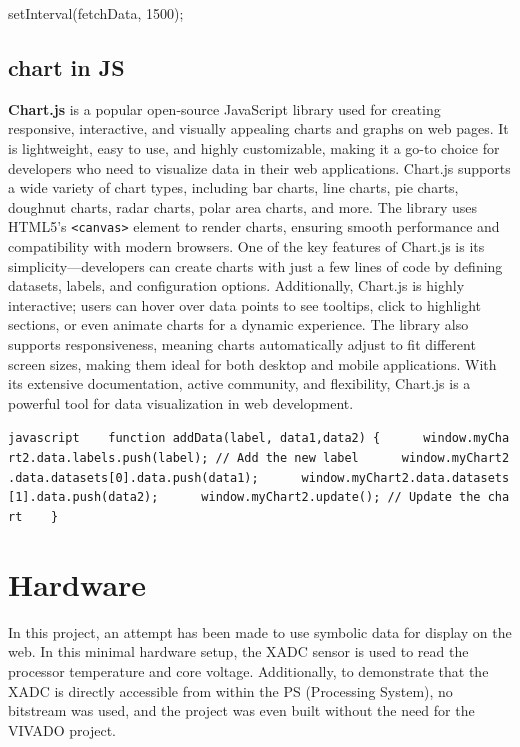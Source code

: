 \documentclass[11pt]{article}
\newenvironment{Shaded}{}{}
\newcommand{\DecValTok}[1]{\textcolor[rgb]{0.25,0.63,0.44}{{#1}}}
\newcommand{\NormalTok}[1]{{#1}}
\newcommand{\OperatorTok}[1]{\textcolor[rgb]{0.40,0.40,0.40}{{#1}}}
\newcommand{\AttributeTok}[1]{\textcolor[rgb]{0.49,0.56,0.16}{{#1}}}
\begin{document}
\begin{Shaded}
\begin{Highlighting}[]
\AttributeTok{setInterval}\NormalTok{(fetchData}\OperatorTok{,} \DecValTok{1500}\NormalTok{)}\OperatorTok{;}
\end{Highlighting}
\end{Shaded}

    \subsection{chart in JS}\label{chart-in-js}

\textbf{Chart.js} is a popular open-source JavaScript library used for
creating responsive, interactive, and visually appealing charts and
graphs on web pages. It is lightweight, easy to use, and highly
customizable, making it a go-to choice for developers who need to
visualize data in their web applications. Chart.js supports a wide
variety of chart types, including bar charts, line charts, pie charts,
doughnut charts, radar charts, polar area charts, and more. The library
uses HTML5's \texttt{\textless{}canvas\textgreater{}} element to render
charts, ensuring smooth performance and compatibility with modern
browsers. One of the key features of Chart.js is its
simplicity---developers can create charts with just a few lines of code
by defining datasets, labels, and configuration options. Additionally,
Chart.js is highly interactive; users can hover over data points to see
tooltips, click to highlight sections, or even animate charts for a
dynamic experience. The library also supports responsiveness, meaning
charts automatically adjust to fit different screen sizes, making them
ideal for both desktop and mobile applications. With its extensive
documentation, active community, and flexibility, Chart.js is a powerful
tool for data visualization in web development.

\texttt{javascript\ \ \ \ function\ addData(label,\ data1,data2)\ \{\ \ \ \ \ \ window.myChart2.data.labels.push(label);\ //\ Add\ the\ new\ label\ \ \ \ \ \ window.myChart2.data.datasets{[}0{]}.data.push(data1);\ \ \ \ \ \ window.myChart2.data.datasets{[}1{]}.data.push(data2);\ \ \ \ \ \ window.myChart2.update();\ //\ Update\ the\ chart\ \ \ \ \}}

    \section{Hardware}\label{hardware}

In this project, an attempt has been made to use symbolic data for
display on the web. In this minimal hardware setup, the XADC sensor is
used to read the processor temperature and core voltage. Additionally,
to demonstrate that the XADC is directly accessible from within the PS
(Processing System), no bitstream was used, and the project was even
built without the need for the VIVADO project.
\end{document}
